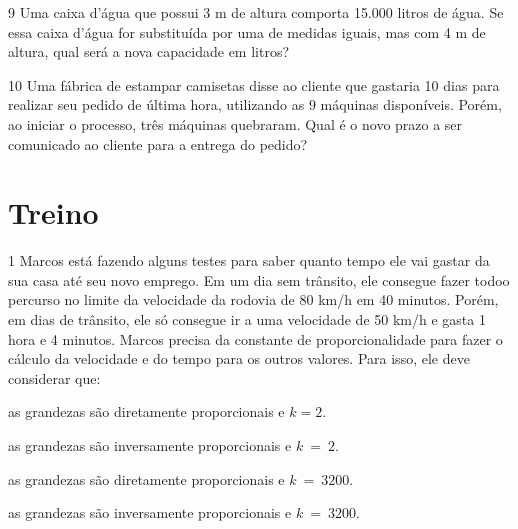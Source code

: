\num{9} Uma caixa d'água que possui 3 m de altura comporta 15.000 litros de
água. Se essa caixa d'água for substituída por uma de medidas iguais,
mas com 4 m de altura, qual será a nova capacidade em litros?


\num{10} Uma fábrica de estampar camisetas disse ao cliente que gastaria 10
dias para realizar seu pedido de última hora, utilizando as 9 máquinas
disponíveis. Porém, ao iniciar o processo, três máquinas quebraram. Qual
é o novo prazo a ser comunicado ao cliente para a entrega do pedido?


\section{Treino}

\num{1} Marcos está fazendo alguns testes para saber quanto tempo ele vai
gastar da sua casa até seu novo emprego. Em um dia sem trânsito, ele
consegue fazer todoo percurso no limite da velocidade da rodovia de 80
km/h em 40 minutos. Porém, em dias de trânsito, ele só consegue ir a uma
velocidade de 50 km/h e gasta 1 hora e 4 minutos. Marcos precisa da
constante de proporcionalidade para fazer o cálculo da velocidade e do
tempo para os outros valores. Para isso, ele deve considerar que:

\begin{escolha}
\item as grandezas são diretamente proporcionais e $k  =  2$.
\item as grandezas são inversamente proporcionais e $k\  = \ 2$.
\item as grandezas são diretamente proporcionais e $k\  = \ 3200$.
\item as grandezas são inversamente proporcionais e $k\  = \ 3200$.
\end{escolha}

